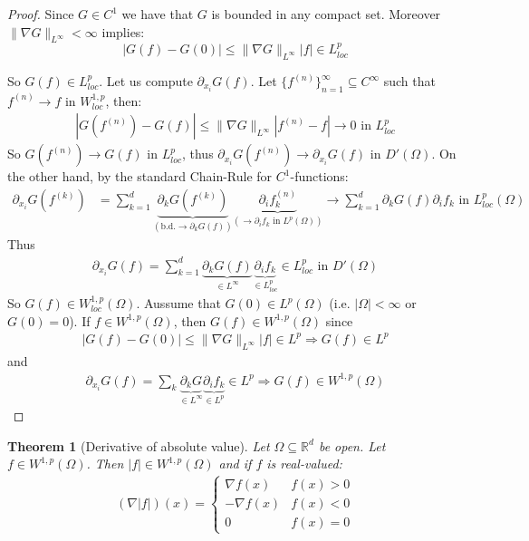 \documentclass{report}
\theoremstyle{tommy}
\newtheorem{thm}[defn]{Theorem}
\begin{document}
  \begin{proof}
    Since \(G \in C^1\) we have that \(G\) is bounded in any compact set. Moreover \(\|\nabla G\|_{L^\infty} < \infty\) implies:
    \[|G(f) - G(0)| \le \|\nabla G\|_{L^\infty} |f| \in L^p_{loc}\]
  
    So \(G(f) \in L_{loc}^p\). Let us compute \(\partial_{x_i} G(f)\). Let \(\{f^{(n)}\}_{n=1}^\infty \subseteq C^\infty\) such that \(f^{(n)} \to f\) in \(W_{loc}^{1,p}\), then: 
    \begin{align*}
      |G(f^{(n)}) - G(f)|
      \le \|\nabla G\|_{L^\infty} |f^{(n)} - f| \to 0 \text{ in  \(L_{loc}^p\)}
    \end{align*}
    So \(G(f^{(n)}) \to G(f)\) in \(L_{loc}^p\), thus \(\partial_{x_i} G(f^{(n)}) \to \partial_{x_i} G(f)\) in \(D'(\Omega)\). On the other hand, by the standard Chain-Rule for \(C^1\)-functions:
    \begin{align*}
      \partial_{x_i} G(f^{(k)})
      &= \sum_{k=1}^d \underbrace{\partial_k G(f^{(k)})}_{(\text{b.d.} \to \partial_k G(f))} \underbrace{\partial_i f_k^{(n)}}_{(\to \partial_i f_k \text{ in } L^p(\Omega))} \to \sum_{k=1}^d \partial_k G(f) \partial_i f_k \text{ in }L_{loc}^p(\Omega)
    \end{align*}
    Thus
    \begin{align*}
      \partial_{x_i} G(f) = \sum_{k=1}^d \underbrace{\partial_k G(f)}_{\in L^\infty} \underbrace{\partial_i f_k}_{\in L_{loc}^p} \in L_{loc}^p \text{ in } D'(\Omega)
    \end{align*}
    So \(G(f) \in W_{loc}^{1,p}(\Omega)\). Aussume that \(G(0) \in L^p(\Omega)\) (i.e. \(|\Omega| < \infty\) or \(G(0) = 0\)). If \(f \in W^{1,p}(\Omega)\), then \(G(f) \in W^{1,p}(\Omega)\) since
    \begin{align*}
      |G(f) - G(0) | \le \|\nabla G\|_{L^\infty} |f| \in L^p \Rightarrow G(f) \in L^p
    \end{align*}
    and 
    \begin{align*}
      \partial_{x_i} G(f) = \sum_k \underbrace{\partial_k G}_{\in L^\infty} \underbrace{\partial_i f_k}_{\in L^p} \in L^p \Rightarrow G(f) \in W^{1,p}(\Omega)
    \end{align*}
  \end{proof}
  
  \begin{thm}[Derivative of absolute value] Let \(\Omega \subseteq \mathbb{R}^d\) be open. Let \(f \in W^{1,p}(\Omega)\). 
    Then \(|f| \in W^{1,p}(\Omega)\)
    and  if \(f\) is real-valued:
    \begin{align*}
      (\nabla |f|) (x) =
      \begin{cases}
        \nabla f(x) & f(x) > 0 \\
        -\nabla f(x) & f(x) < 0 \\
        0 & f(x) = 0
      \end{cases}
    \end{align*}
  \end{thm}
\end{document}
